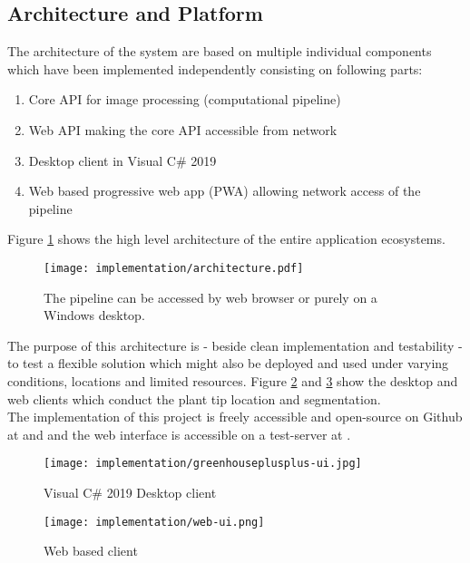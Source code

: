 \subsection{Architecture and Platform}\label{sec:architecture}

The architecture of the system are based on multiple individual components which have been implemented
independently consisting on following parts:

\begin{enumerate}
    \item Core API for image processing (computational pipeline) \cite{greenhouseplusplus}
    \item Web API making the core API accessible from network \cite{greenhouseplusplus}
    \item Desktop client in Visual C\# 2019 \cite{greenhouseplusplus}
    \item Web based progressive web app (PWA) allowing network access of the pipeline \cite{greenhouseplusplus:app}
\end{enumerate}

Figure \ref{fig:arch} shows the high level architecture of the entire application ecosystems.

\begin{figure}[H]
    \centering
    \texttt{[image: implementation/architecture.pdf]}
    \caption{The pipeline can be accessed by web browser or purely on a Windows desktop.}
    \label{fig:arch}
\end{figure}

The purpose of this architecture is - beside clean implementation and testability - to test a flexible
solution which might also be deployed and used under varying conditions, locations and limited resources.
Figure \ref{fig:desktopclient} and \ref{fig:webclient} show the desktop and web clients
which conduct the plant tip location and segmentation.\\

The implementation of this project is freely accessible and open-source on Github
at \cite{greenhouseplusplus} and \cite{greenhouseplusplus:app} and the web interface is accessible
on a test-server at \cite{greenhouseplusplus:live}.

\begin{figure}[H]
    \centering
    \texttt{[image: implementation/greenhouseplusplus-ui.jpg]}
    \caption{Visual C\# 2019 Desktop client}
    \label{fig:desktopclient}
\end{figure}

\begin{figure}[H]
    \centering
    \texttt{[image: implementation/web-ui.png]}
    \caption{Web based client}
    \label{fig:webclient}
\end{figure}